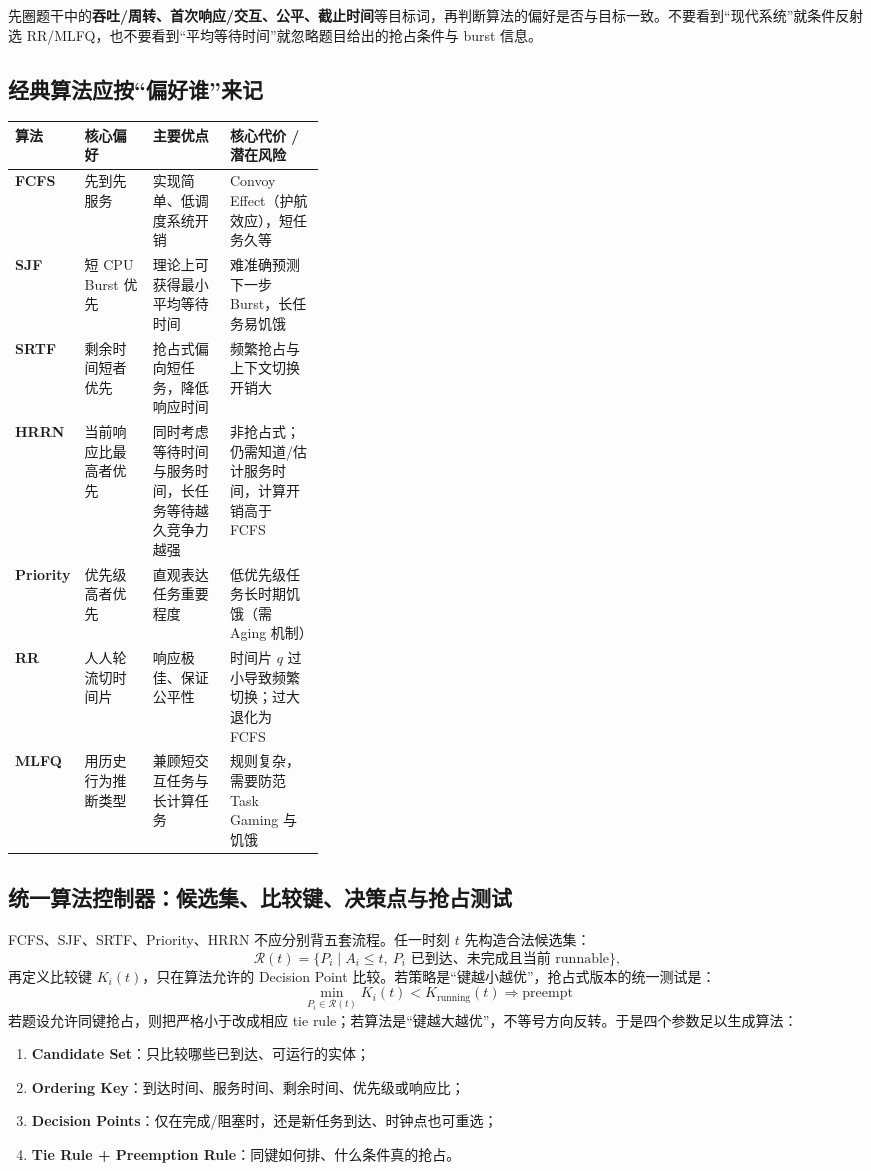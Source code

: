 \documentclass[11pt,a4paper]{ctexart}
\newcommand{\kw}[1]{\textbf{#1}}
\begin{document}
\begin{exam}[调度算法选择题的第一动作]
先圈题干中的\kw{吞吐/周转、首次响应/交互、公平、截止时间}等目标词，再判断算法的偏好是否与目标一致。不要看到“现代系统”就条件反射选 RR/MLFQ，也不要看到“平均等待时间”就忽略题目给出的抢占条件与 burst 信息。
\end{exam}

\subsection{经典算法应按“偏好谁”来记}

\begingroup
\small
\renewcommand{\arraystretch}{1.25}
\setlength{\tabcolsep}{5pt}
\begin{tabularx}{\linewidth}{>{\bfseries}p{0.14\linewidth} p{0.22\linewidth} X X}
\toprule
算法 & 核心偏好 & 主要优点 & 核心代价 / 潜在风险\\
\midrule
FCFS & 先到先服务 & 实现简单、低调度系统开销 & Convoy Effect（护航效应），短任务久等\\
SJF & 短 CPU Burst 优先 & 理论上可获得最小平均等待时间 & 难准确预测下一步 Burst，长任务易饥饿\\
SRTF & 剩余时间短者优先 & 抢占式偏向短任务，降低响应时间 & 频繁抢占与上下文切换开销大\\
HRRN & 当前响应比最高者优先 & 同时考虑等待时间与服务时间，长任务等待越久竞争力越强 & 非抢占式；仍需知道/估计服务时间，计算开销高于 FCFS\\
Priority & 优先级高者优先 & 直观表达任务重要程度 & 低优先级任务长时期饥饿（需 Aging 机制）\\
RR & 人人轮流切时间片 & 响应极佳、保证公平性 & 时间片 $q$ 过小导致频繁切换；过大退化为 FCFS\\
MLFQ & 用历史行为推断类型 & 兼顾短交互任务与长计算任务 & 规则复杂，需要防范 Task Gaming 与饥饿\\
\bottomrule
\end{tabularx}
\endgroup

\subsection{统一算法控制器：候选集、比较键、决策点与抢占测试}

FCFS、SJF、SRTF、Priority、HRRN 不应分别背五套流程。任一时刻 $t$ 先构造合法候选集：
\[
\mathcal R(t)=\{P_i\mid A_i\le t,\ P_i\text{ 已到达、未完成且当前 runnable}\},
\]
再定义比较键 $K_i(t)$，只在算法允许的 Decision Point 比较。若策略是“键越小越优”，抢占式版本的统一测试是：
\[
\boxed{\min_{P_i\in\mathcal R(t)}K_i(t)<K_{\text{running}}(t)\Longrightarrow\text{preempt}}
\]
若题设允许同键抢占，则把严格小于改成相应 tie rule；若算法是“键越大越优”，不等号方向反转。于是四个参数足以生成算法：
\begin{enumerate}
\item \kw{Candidate Set}：只比较哪些已到达、可运行的实体；
\item \kw{Ordering Key}：到达时间、服务时间、剩余时间、优先级或响应比；
\item \kw{Decision Points}：仅在完成/阻塞时，还是新任务到达、时钟点也可重选；
\item \kw{Tie Rule + Preemption Rule}：同键如何排、什么条件真的抢占。
\end{enumerate}
\end{document}
